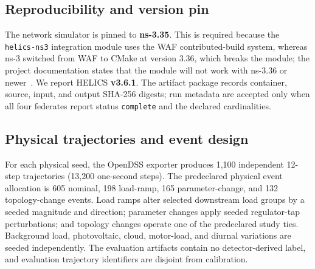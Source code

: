 \documentclass[journal]{IEEEtran}
\theoremstyle{plain}
\theoremstyle{definition}
\theoremstyle{remark}
\begin{document}
\subsection{Reproducibility and version pin}
The network simulator is pinned to \textbf{ns-3.35}. This is required
because the \texttt{helics-ns3} integration module uses the WAF
contributed-build system, whereas ns-3 switched from WAF to CMake at
version 3.36, which breaks the module; the project documentation states
that the module will not work with ns-3.36 or newer~\cite{helicsns3}. We
report HELICS \textbf{v3.6.1}. The artifact package records container,
source, input, and output SHA-256 digests; run metadata are accepted only
when all four federates report status \texttt{complete} and the declared
cardinalities.

\subsection{Physical trajectories and event design}
For each physical seed, the OpenDSS exporter produces 1,100 independent
12-step trajectories (13,200 one-second steps). The predeclared physical
event allocation is 605 nominal, 198 load-ramp, 165 parameter-change, and
132 topology-change events. Load ramps alter selected downstream load
groups by a seeded magnitude and direction; parameter changes apply
seeded regulator-tap perturbations; and topology changes operate one of
the predeclared study ties. Background load, photovoltaic, cloud,
motor-load, and diurnal variations are seeded independently. The
evaluation artifacts contain no detector-derived label, and evaluation
trajectory identifiers are disjoint from calibration.
\end{document}
